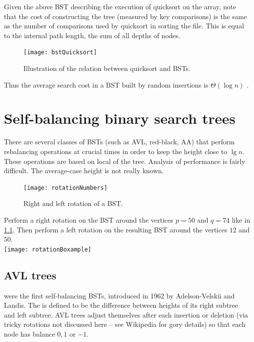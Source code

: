 Given the above BST describing the execution of quicksort on the array, 
note that the cost of constructing the tree (measured by key comparisons) is 
the same as the number of comparisons used by quicksort in sorting the file.
This is equal to the internal path length, the sum of all depths of nodes.

\begin{figure}[htb]
  \centering
  \texttt{[image: bstQuicksort]}
  \caption{Illustration of the relation between quicksort and BSTs.}
  \label{fig:bstQuicksort}
\end{figure}

Thus the average search cost in a BST built by random insertions is $\Theta(\log n)$ .


\chapter{Self-balancing binary search trees} %
\label{sec:balanced}
There are several classes of BSTs (such as AVL, red-black, AA) that 
perform rebalancing operations at crucial times in order to keep the height 
close to $\lg n$.
These operations are based on local  of the tree.
Analysis of performance is fairly difficult.
The average-case height is not really known.

\begin{figure}[htb]
  \centering
  \texttt{[image: rotationNumbers]}
  \caption{Right and left rotation of a BST.}
  \label{fig:rotation}
\end{figure} 

\begin{Boxample}[7]
Perform a right rotation on the BST around the vertices $p = 50$ and $q = 74$ like in \cref{fig:rotation}.
Then perform a left rotation on the resulting BST around the vertices $12$ and $50$.\\
\newline 
\texttt{[image: rotationBoxample]}
\end{Boxample}


\section{AVL trees}
 were the first self-balancing BSTs, introduced in 1962 by Adelson-Velskii and Landis. 
The  is defined to be the difference between heights of its 
right subtree and left subtree. 
AVL trees adjust themselves after each insertion or deletion (via tricky rotations not discussed here -- see Wikipedia for gory details) 
so that each node has balance $0, 1$ or $-1$.

